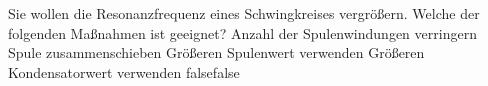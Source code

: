     {Sie wollen die Resonanzfrequenz eines Schwingkreises vergrößern. Welche der folgenden Maßnahmen ist geeignet?}
    {Anzahl der Spulenwindungen verringern}
    {Spule zusammenschieben}
    {Größeren Spulenwert verwenden}
    {Größeren Kondensatorwert verwenden}
    {false}{false}